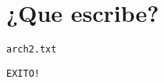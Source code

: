 \section{¿Que escribe?}

\begin{center}
\texttt{arch2.txt}
\begin{lstlisting}[style=consola]
EXITO!
\end{lstlisting}
\end{center}
